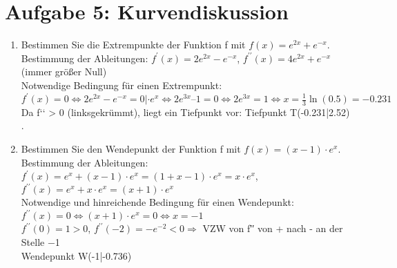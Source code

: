 \documentclass[11pt,a4paper, parskip=half ]{report}
\begin{document}
  \section*{Aufgabe 5: Kurvendiskussion}
\begin{enumerate}
  \item Bestimmen Sie die Extrempunkte der Funktion f mit $f(x) = e^{2x} + e^{-x}$.
  \vspace{20pt}
  \\Bestimmung der Ableitungen:	$f^{\prime}(x) =  2e^{2x} - e^{-x}$, $f^{\prime\prime}(x) =  4e^{2x} + e^{-x}$	(immer größer Null)\\
	Notwendige Bedingung für einen Extrempunkt:\\  
			$f^{\prime}(x) = 0	\Leftrightarrow  2e^{2x} - e^{-x} = 0 |\cdot e^x  	\Leftrightarrow 2e^{3x} – 1 = 0  \Leftrightarrow     2e^{3x} = 1
			\Leftrightarrow x= \frac{1}{3} \ln(0.5) = -0.231$\\				
  Da f‘‘ > 0 (linksgekrümmt), liegt ein Tiefpunkt vor:	Tiefpunkt T(-0.231|2.52) .

  \item Bestimmen Sie den Wendepunkt der Funktion f mit $f(x) = (x-1)\cdot e^x$.
  \vspace{20pt}
  \\Bestimmung der Ableitungen:  $f^{\prime}(x) = e^x + (x-1)\cdot e^x = (1+x-1)\cdot e^x = x\cdot e^x$, $f^{\prime\prime}(x) = e^x + x\cdot e^x = (x+1)\cdot e^x$	
  \\Notwendige und hinreichende Bedingung für einen Wendepunkt:  
  \\$f^{\prime\prime}(x) = 0	\Leftrightarrow   (x +1)\cdot e^x = 0   \Leftrightarrow x = -1$
  \\$f^{\prime\prime}(0) = 1> 0$, $f^{\prime\prime}(-2) = -e^{-2}< 0   \Rightarrow$ VZW von f′′ von + nach - an der Stelle \num{-1}	
  \\Wendepunkt W(-1|-0.736) 	

\end{enumerate}
\end{document}
